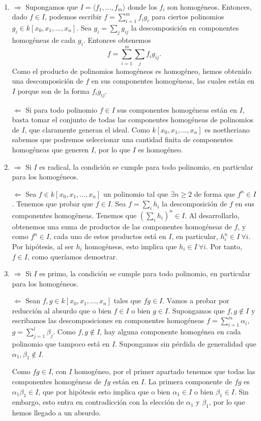 \documentclass[twoside]{article}
\begin{document}
\begin{solucion}\
\begin{enumerate}
\item $\boxed{\Rightarrow}$ Supongamos que $I=\langle f_1,\dots, f_m\rangle$ donde los $f_i$ son homogéneos. Entonces, dado $f\in I$, podemos escribir $f=\sum_{i=1}^mf_ig_i$ para ciertos polinomios $g_i\in k[x_0,x_1,\dots,x_n]$. Sea $g_i=\sum_j g_{ij}$ la descomposición en componentes homogéneas de cada $g_i$. Entonces obtenemos 
$$f=\sum_{i=1}^m\sum_j f_ig_{ij}.$$
Como el producto de polinomios homogéneos es homogéneo, hemos obtenido una descomposición de $f$ en sus componentes homogéneas, las cuales están en $I$ porque son de la forma $f_ig_{ij}$. 

$\boxed{\Leftarrow}$ Si para todo polinomio $f\in I$ sus componentes homogéneas están en $I$, basta tomar el conjunto de todas las componentes homogéneas de polinomios de $I$, que claramente generan el ideal. Como $k[x_0,x_1,\dots,x_n]$ es noetheriano sabemos que podremos seleccionar una cantidad finita de componentes homogéneas que generen $I$, por lo que $I$ es homogéneo.

\newpage

\item $\boxed{\Rightarrow}$ Si $I$ es radical, la condición se cumple para todo polinomio, en particular para los homogéneos.

$\boxed{\Leftarrow}$ Sea $f\in k[x_0,x_1,\dots,x_n]$ un polinomio tal que $\exists n\geq 2$ de forma que $f^n\in I$. Tenemos que probar que $f\in I$. Sea $f=\sum_i h_i$ la descomposición de $f$ en sus componentes homogéneas. Tenemos que $\left(\sum_i h_i\right)^n\in I$. Al desarrollarlo, obtenemos una suma de productos de las componentes homogéneas de $f$, y como $f^n\in I$, cada uno de estos productos está en $I$, en particular, $h_i^n\in I\ \forall i$. Por hipótesis, al ser $h_i$ homogéneos, esto implica que $h_i\in I\ \forall i$. Por tanto, $f\in I$, como queríamos demostrar.

\item $\boxed{\Rightarrow}$ Si $I$ es primo, la condición se cumple para todo polinomio, en particular para los homogéneos.

$\boxed{\Leftarrow}$ Sean $f,g\in k[x_0,x_1,\dots,x_n]$ tales que $fg\in I$. Vamos a probar por reducción al absurdo que o bien $f\in I$ o bien $g\in I$. Supongamos que $f,g\notin I$ y escribamos las descomposiciones en componentes homogéneas $f=\sum_{i=1}^m \alpha_i$, $g=\sum_{j=1}^l\beta_j$. Como $f,g\notin I$, hay alguna componente homogénea en cada polinomio que tampoco está en $I$. Supongamos sin pérdida de generalidad que $\alpha_1,\beta_1\notin I$. 

Como $fg\in I$, con $I$ homogéneo, por el primer apartado tenemos que todas las componentes homogéneas de $fg$ están en $I$. La primera componente de $fg$ es $\alpha_1\beta_1\in I$, que por hipótesis esto implica que o bien $\alpha_1\in I$ o bien $\beta_1\in I$. Sin embargo, esto entra en contradicción con la elección de $\alpha_1$ y $\beta_1$, por lo que hemos llegado a un absurdo.


\end{enumerate}

\end{solucion}
\end{document}
